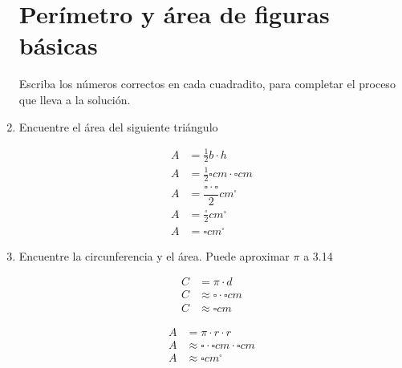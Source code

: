 \documentclass[twoside,letterpaper]{article}
\begin{document}
\begin{multicols}{2}
\begin{enumerate}
\section*{Perímetro y área de figuras básicas}
Escriba los números correctos en cada cuadradito, para completar el proceso que lleva a la solución.
\item Encuentre el área del siguiente triángulo
\begin{minipage}{.25\textwidth}
\end{minipage}
\begin{minipage}{.25\textwidth}
\begin{align*}
A&=\frac{1}{2}b\cdot h\\
A&=\frac{1}{2} \square cm \cdot \square cm\\
A&=\dfrac{\square \cdot \square}{2}cm^{\square}\\
A&=\frac{\square}{2}cm^{\square}\\
A&=\square cm^{\square}
\end{align*}
\end{minipage}

\item Encuentre la circunferencia y el área. Puede aproximar $\pi$ a 3.14

\begin{minipage}{.1\textwidth}
\begin{align*}
C&=\pi \cdot d\\
C&\approx \square \cdot \square cm\\
C&\approx \square cm
\end{align*}
\end{minipage}\hfill
\begin{minipage}{.15\textwidth}
\end{minipage}\hfill
\begin{minipage}{.15\textwidth}
\begin{align*}
A&=\pi \cdot r \cdot r\\
A&\approx \square \cdot \square cm \cdot \square cm\\
A&\approx \square cm ^{\square}
\end{align*}
\end{minipage}
\end{enumerate}
\end{multicols}
\end{document}
